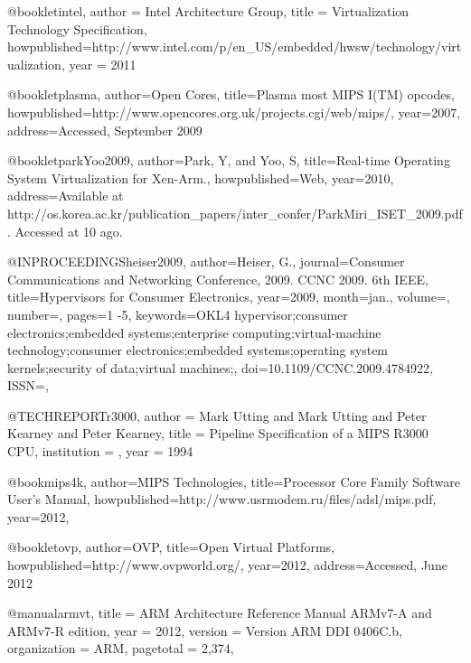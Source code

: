 @booklet{intel,
author = {{Intel Architecture Group}},
title = {{Virtualization Technology Specification}},
howpublished={http://www.intel.com/p/en\_US/embedded/hwsw/technology/virtualization},
year = {2011}
}

@booklet{plasma,
	author={Open Cores},
	title={Plasma \- most MIPS I(TM) opcodes},
	howpublished={http://www.opencores.org.uk/projects.cgi/web/mips/},
	year={2007},
	address={Accessed, September 2009}
}



@booklet{parkYoo2009,
author={Park, Y, and Yoo, S},
	title={Real-time Operating System Virtualization for Xen-Arm.},
	howpublished={Web},
	year={2010},
	address={Available at http://os.korea.ac.kr/publication\_papers/inter\_confer/ParkMiri\_ISET\_2009.pdf. Accessed at 10 ago.}
}

@INPROCEEDINGS{heiser2009,
author={Heiser, G.},
journal={Consumer Communications and Networking Conference, 2009. CCNC 2009. 6th IEEE}, 
title={Hypervisors for Consumer Electronics},
year={2009},
month={jan.},
volume={},
number={},
pages={1 -5},
keywords={OKL4 hypervisor;consumer electronics;embedded systems;enterprise computing;virtual-machine technology;consumer electronics;embedded systems;operating system kernels;security of data;virtual machines;},
doi={10.1109/CCNC.2009.4784922},
ISSN={},}


@TECHREPORT{r3000,
    author = {Mark Utting and Mark Utting and Peter Kearney and Peter Kearney},
    title = {Pipeline Specification of a MIPS R3000 CPU},
    institution = {},
    year = {1994}
}

@book{mips4k,
	author={{MIPS Technologies}},
	title={Processor Core Family Software User's Manual},
	howpublished={http://www.usrmodem.ru/files/adsl/mips.pdf},
	year={2012},
}

@booklet{ovp,
	author={{OVP}},
	title={Open Virtual Platforms},
	howpublished={http://www.ovpworld.org/},
	year={2012},
	address={Accessed, June 2012}
}


@manual{armvt,
    title = {ARM Architecture Reference Manual ARMv7-A and ARMv7-R edition},
    year = {2012},
    version = {Version ARM DDI 0406C.b},
    organization = {ARM},
    pagetotal = {2,374},
}

